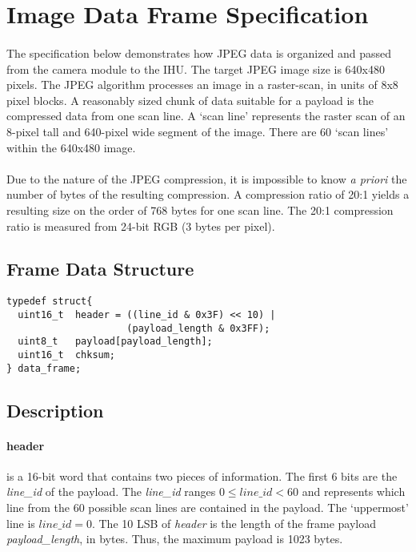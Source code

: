 \documentclass[10pt,letterpaper]{article}
\author{Mitch Davis}
\begin{document}
\section*{Image Data Frame Specification}
\paragraph{}The specification below demonstrates how JPEG data is organized and passed from the camera module to the IHU.  The target JPEG image size is 640x480 pixels.  The JPEG algorithm processes an image in a raster-scan, in units of 8x8 pixel blocks.  A reasonably sized chunk of data suitable for a payload is the compressed data from one scan line.  A `scan line' represents the raster scan of an 8-pixel tall and 640-pixel wide segment of the image.  There are 60 `scan lines' within the 640x480 image.
\paragraph{}Due to the nature of the JPEG compression, it is impossible to know \textit{a priori} the number of bytes of the resulting compression.  A compression ratio of 20:1 yields a resulting size on the order of 768 bytes for one scan line.  The 20:1 compression ratio is measured from 24-bit RGB (3 bytes per pixel).
\subsection*{Frame Data Structure}
\lstset{language=C}
\begin{lstlisting}[frame=single]
typedef struct{
  uint16_t 	header = ((line_id & 0x3F) << 10) | 
    		         (payload_length & 0x3FF);
  uint8_t 	payload[payload_length];
  uint16_t 	chksum;
} data_frame;
\end{lstlisting}
\subsection*{Description}
\paragraph{header} is a 16-bit word that contains two pieces of information.  The first 6 bits are the \textit{line\_id} of the payload.  The \textit{line\_id} ranges $0\leq line\_id < 60$ and represents which line from the 60 possible scan lines are contained in the payload.  The `uppermost' line is $line\_id=0$.  The 10 LSB of \textit{header} is the length of the frame payload \textit{payload\_length}, in bytes.  Thus, the maximum payload is 1023 bytes.
\end{document}
